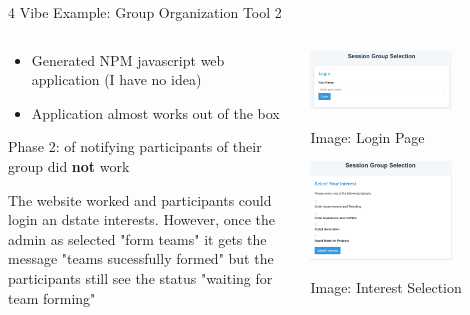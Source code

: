 \documentclass[xcolor={dvipsnames,table}, aspectratio=169]{beamer}
\begin{document}
\begin{frame}{4 Vibe Example: Group Organization Tool 2}
  \begin{columns}[T]
    \begin{column}{0.5\textwidth}
      \begin{itemize}
          \item Generated NPM javascript web application (I have no idea)
          \item Application almost works out of the box
      \end{itemize}
      \begin{alertbox}\small
          Phase 2: of notifying participants of their group did \textbf{not} work
      \end{alertbox}
      \begin{promptbox}\small
        The website worked and participants could login an dstate interests. However, once the admin as selected "form teams" it gets the message "teams sucessfully formed" but the participants still see the status "waiting for team forming"
      \end{promptbox}
    \end{column}
    \begin{column}{0.5\textwidth}
        
      \centering\includegraphics[width=0.7\textwidth]{images/GroupOrg.png}
      \tiny\centerline{Image: Login Page}
      \centering\includegraphics[width=0.7\textwidth]{images/GroupOrg2.png}
      \tiny\centerline{Image: Interest Selection}
    \end{column}
  \end{columns}
\end{frame}
\end{document}
